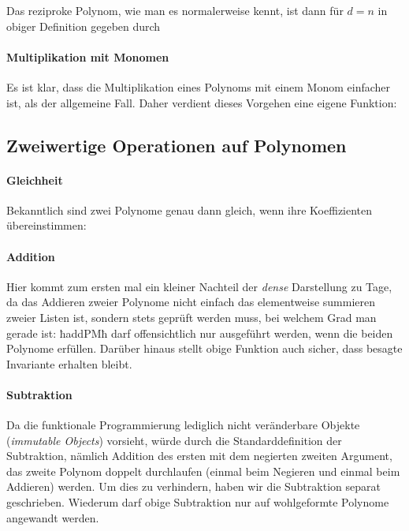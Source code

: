 
Das reziproke Polynom, wie man es normalerweise kennt, ist dann für $d=n$ in
obiger Definition gegeben durch



\paragraph{Multiplikation mit Monomen}
Es ist klar, dass die Multiplikation eines Polynoms mit einem Monom einfacher
ist, als der allgemeine Fall. Daher verdient dieses Vorgehen eine eigene
Funktion:





\subsection{Zweiwertige Operationen auf Polynomen}
\paragraph{Gleichheit} Bekanntlich sind zwei Polynome 
genau dann gleich, wenn ihre Koeffizienten übereinstimmen:

\paragraph{Addition} Hier kommt zum ersten mal ein kleiner Nachteil der
\emph{dense} Darstellung zu Tage, da das Addieren zweier Polynome nicht einfach
das elementweise summieren zweier Listen ist, sondern stets geprüft werden
muss, bei welchem Grad man gerade ist:
ħaddPMħ darf offensichtlich nur ausgeführt werden, wenn die beiden Polynome
 erfüllen. Darüber hinaus stellt obige Funktion auch sicher,
dass besagte Invariante erhalten bleibt.

\paragraph{Subtraktion} Da die funktionale Programmierung lediglich 
nicht veränderbare Objekte (\emph{immutable Objects}) vorsieht, würde durch die
Standarddefinition der Subtraktion, nämlich Addition des ersten mit dem
negierten zweiten Argument, das zweite Polynom doppelt durchlaufen (einmal beim
Negieren und einmal beim Addieren) werden. Um dies zu verhindern, haben wir die
Subtraktion separat geschrieben.
Wiederum darf obige Subtraktion nur auf wohlgeformte Polynome angewandt werden.


